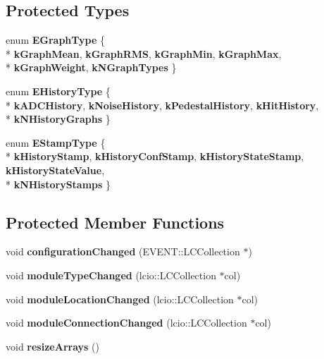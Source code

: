 \subsection*{Protected Types}
\begin{DoxyCompactItemize}
\item 
enum {\bfseries E\-Graph\-Type} \{ \\*
{\bfseries k\-Graph\-Mean}, 
{\bfseries k\-Graph\-R\-M\-S}, 
{\bfseries k\-Graph\-Min}, 
{\bfseries k\-Graph\-Max}, 
\\*
{\bfseries k\-Graph\-Weight}, 
{\bfseries k\-N\-Graph\-Types}
 \}
\item 
enum {\bfseries E\-History\-Type} \{ \\*
{\bfseries k\-A\-D\-C\-History}, 
{\bfseries k\-Noise\-History}, 
{\bfseries k\-Pedestal\-History}, 
{\bfseries k\-Hit\-History}, 
\\*
{\bfseries k\-N\-History\-Graphs}
 \}
\item 
enum {\bfseries E\-Stamp\-Type} \{ \\*
{\bfseries k\-History\-Stamp}, 
{\bfseries k\-History\-Conf\-Stamp}, 
{\bfseries k\-History\-State\-Stamp}, 
{\bfseries k\-History\-State\-Value}, 
\\*
{\bfseries k\-N\-History\-Stamps}
 \}
\end{DoxyCompactItemize}
\subsection*{Protected Member Functions}
\begin{DoxyCompactItemize}
\item 
void {\bfseries configuration\-Changed} (E\-V\-E\-N\-T\-::\-L\-C\-Collection $\ast$)\label{classCALICE_1_1AverageHistoryGraphs_a176525151e7d59d850f171befa7d793b}

\item 
void {\bfseries module\-Type\-Changed} (lcio\-::\-L\-C\-Collection $\ast$col)\label{classCALICE_1_1AverageHistoryGraphs_acdba66e246541547c5fb4ba032e4c781}

\item 
void {\bfseries module\-Location\-Changed} (lcio\-::\-L\-C\-Collection $\ast$col)\label{classCALICE_1_1AverageHistoryGraphs_ab2da21acfb64312a3182becc51232998}

\item 
void {\bfseries module\-Connection\-Changed} (lcio\-::\-L\-C\-Collection $\ast$col)\label{classCALICE_1_1AverageHistoryGraphs_a126a4d42d653c4c005a5135d0dfea159}

\item 
void {\bfseries resize\-Arrays} ()\label{classCALICE_1_1AverageHistoryGraphs_a1f1586ff5a3fe049d6613a296128bbcd}

\end{DoxyCompactItemize}
